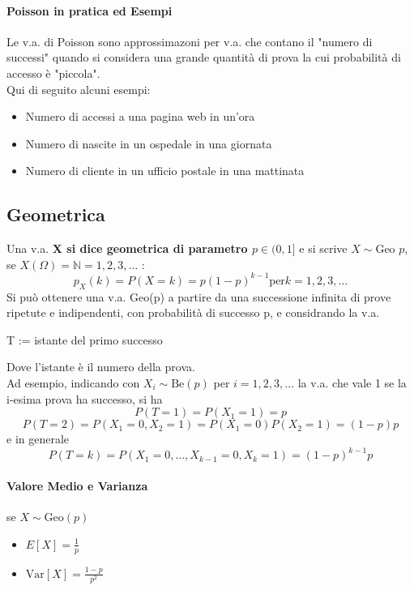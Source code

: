 \paragraph*{Poisson in pratica ed Esempi}
Le v.a. di Poisson sono approssimazoni per v.a. che contano il "numero di successi"
quando si considera una grande quantità di prova la cui probabilità di accesso è "piccola".
\\ Qui di seguito alcuni esempi: 
\begin{itemize}
    \item Numero di accessi a una pagina web in un'ora
    \item Numero di nascite in un ospedale in una giornata
    \item Numero di cliente in un ufficio postale in una mattinata
\end{itemize}

\subsection*{Geometrica}
Una v.a. \textbf{X si dice geometrica di parametro $p \in (0,1]$} e si scrive 
\textbf{$X \sim \text{Geo }p$}, se \textbf{$X(\Omega)=\mathbb{N} = {1,2,3,\dots}$} :
\begin{equation*}
    p_X (k) = P(X = k) = p(1-p)^{k-1} \text{per} k=1,2,3,\dots
\end{equation*}
Si può ottenere una v.a. Geo(p) a partire da una successione infinita di prove ripetute
e indipendenti, con probabilità di successo p, e considrando la v.a.
\begin{center}
    T := istante del primo successo
\end{center}
Dove l'istante è il numero della prova.
\\ Ad esempio, indicando con $X_i \sim \text{Be}(p)$ per $i=1,2,3,\dots$ la v.a. che vale 1
se la i-esima prova ha successo, si ha
\begin{equation*}
    P(T=1) = P(X_1 = 1) = p
\end{equation*}
\begin{equation*}
    P(T=2) = P(X_1 = 0, X_2 = 1) = P(X_1 = 0)P(X_2 = 1) = (1-p)p
\end{equation*}
e in generale
\begin{equation*}
    P(T=k) = P(X_1=0, \dots, X_{k-1} = 0, X_k = 1) = (1-p)^{k-1}p
\end{equation*}
\paragraph*{Valore Medio e Varianza} se $X\sim \text{Geo}(p)$
\begin{itemize}
    \item $E[X] = \frac{1}{p}$
    \item $\text{Var}[X] = \frac{1-p}{p^2}$
\end{itemize}
